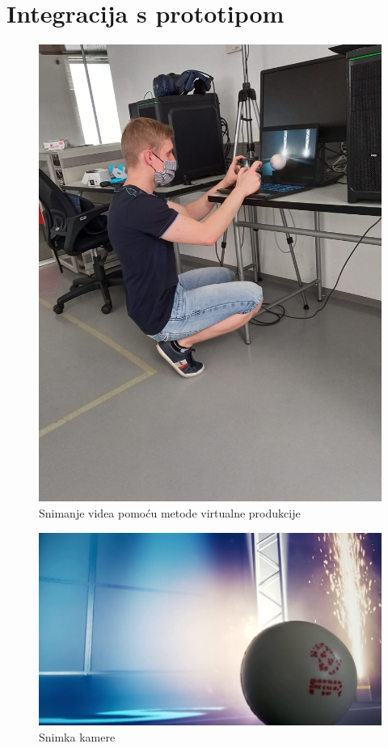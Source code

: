 \documentclass[times, utf8, zavrsni, numeric]{fer}
\begin{document}
\chapter{Integracija s prototipom}

\begin{figure}[htp]
	\centering
	\includegraphics[width=\linewidth]{slika 7-1.jpg}
	\caption{Snimanje videa pomoću metode virtualne produkcije}
	\label{fig:slika 7-1}
\end{figure}

\begin{figure}[htp]
	\centering
	\includegraphics[width=\linewidth]{slika 7-2.png}
	\caption{Snimka kamere}
	\label{fig:slika 7-2}
\end{figure}
\end{document}

